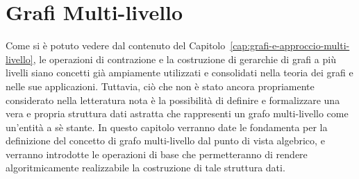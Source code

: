 \chapter{Grafi Multi-livello}\label{cap:grafi-multi-livello}

Come si \`e potuto vedere dal contenuto del Capitolo~\ref{cap:grafi-e-approccio-multi-livello},
le operazioni di contrazione e la costruzione di
gerarchie di grafi a pi\`u livelli siano concetti gi\`a ampiamente utilizzati e consolidati nella teoria dei grafi e
nelle sue applicazioni.
Tuttavia, ci\`o che non \`e stato ancora propriamente considerato nella letteratura nota \`e la possibilit\`a di
definire e formalizzare una vera e propria struttura dati astratta che rappresenti un grafo multi-livello
come un'entit\`a a s\`e stante.
In questo capitolo verranno date le fondamenta per la definizione del concetto di grafo multi-livello dal
punto di vista algebrico, e verranno introdotte le operazioni di base che permetteranno di rendere
algoritmicamente realizzabile la costruzione di tale struttura dati.









